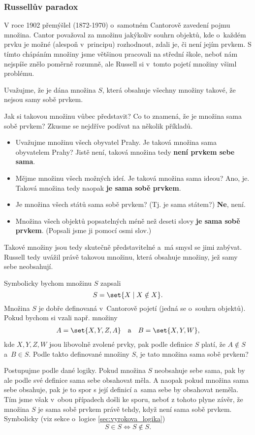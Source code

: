 \subsubsection{Russellův paradox}
V roce 1902 přemýšlel  \mbox{(1872-1970)} o~samotném Cantorově zavedení pojmu množina. Cantor považoval za množinu jakýkoliv souhrn objektů, kde o~každém prvku je možné (alespoň v~principu) rozhodnout, zdali je, či není jejím prvkem. S tímto chápáním množiny jsme většinou pracovali na střední škole, neboť nám nejspíše znělo poměrně rozumně, ale Russell si v~tomto pojetí množiny všiml problému.\par
Uvažujme, že je dána množina $S$, která obsahuje všechny množiny takové, že nejsou samy sobě prvkem.\par
Jak si takovou množinu vůbec představit? Co to znamená, že je množina sama sobě prvkem? Zkusme se nejdříve podívat na několik příkladů.
\begin{itemize}
    \item Uvažujme množinu všech obyvatel Prahy. Je taková množina sama obyvatelem Prahy? Jistě není, taková množina tedy \textbf{není prvkem sebe sama}.
    \item Mějme množinu všech možných ideí. Je taková množina sama ideou? Ano, je. Taková množina tedy naopak \textbf{je sama sobě prvkem}.
    \item Je množina všech států sama sobě prvkem? (Tj. je sama státem?) \textbf{Ne}, není.
    \item Množina všech objektů popsatelných méně než deseti slovy \textbf{je sama sobě prvkem}. (Popsali jsme ji pomocí osmi slov.)
\end{itemize}
Takové množiny jsou tedy skutečně představitelné a~má smysl se jimi zabývat. Russell tedy uvážil právě takovou množinu, která obsahuje množiny, jež samy sebe neobsahují.

Symbolicky bychom množinu $S$ zapsali
\begin{equation*}
S=\set{X \mid X \notin X}.
\end{equation*}
Množina $S$ je dobře definovaná v~Cantorově pojetí (jedná se o~souhrn objektů). Pokud bychom si vzali např. množiny
\begin{align*}
A=\set{X,Y,Z,A} \quad \text{a} \quad B=\set{X,Y,W},
\end{align*}
kde $X,Y,Z,W$ jsou libovolně zvolené prvky, pak podle definice $S$ platí, že $A \notin S$ a~$B \in S$. Podle takto definované množiny $S$, je tato množina sama sobě prvkem?\par
Postupujme podle dané logiky. Pokud množina $S$ neobsahuje sebe sama, pak by ale podle své definice sama sebe obsahovat měla. A naopak pokud množina sama sebe obsahuje, pak je to spor s její definicí a~sama sebe by obsahovat neměla. Tím jsme však v~obou případech došli ke sporu, neboť z tohoto plyne závěr, že množina $S$ je sama sobě prvkem právě tehdy, když není sama sobě prvkem. Symbolicky (viz sekce o~logice \ref{sec:vyrokova_logika})
\begin{equation*}
S \in S \iff S \notin S.
\end{equation*}

